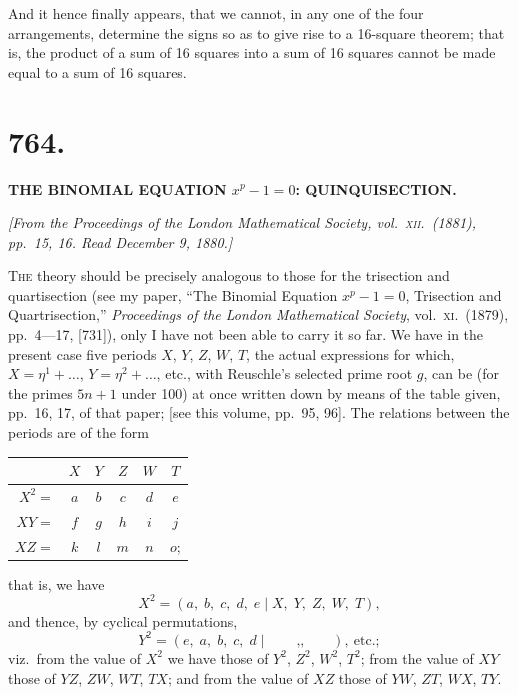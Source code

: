 \documentclass[11pt,a4paper,english]{article}
\theoremstyle{plain}
\begin{document}
And it hence finally appears, that we cannot, in any one of the four arrangements, determine the signs so as to give rise to a 16-square theorem; that is, the product of a sum of 16 squares into a sum of 16 squares cannot be made equal to a sum of 16 squares.

\newpage

\section*{764.}

\begin{center}
\textbf{THE BINOMIAL EQUATION $x^p - 1 = 0$: QUINQUISECTION.}
\end{center}

\noindent\textit{[From the \textit{Proceedings of the London Mathematical Society}, vol.\ \textsc{xii}.\ (1881), pp.\ 15, 16. Read December 9, 1880.]}

\vspace{\baselineskip}

\textsc{The} theory should be precisely analogous to those for the trisection and quartisection (see my paper, ``The Binomial Equation $x^p - 1 = 0$, Trisection and Quartrisection,'' \textit{Proceedings of the London Mathematical Society}, vol.\ \textsc{xi}.\ (1879), pp.\ 4---17, [731]), only I have not been able to carry it so far. We have in the present case five periods $X$, $Y$, $Z$, $W$, $T$, the actual expressions for which, $X = \eta^1 + \ldots$, $Y = \eta^2 + \ldots$, etc., with Reuschle's selected prime root $g$, can be (for the primes $5n + 1$ under 100) at once written down by means of the table given, pp.\ 16, 17, of that paper; [see this volume, pp.\ 95, 96]. The relations between the periods are of the form
\begin{center}
\begin{tabular}{r | c c c c c}
& $X$ & $Y$ & $Z$ & $W$ & $T$ \\ \hline
$X^2 =$ & $a$ & $b$ & $c$ & $d$ & $e$ \\
$XY =$ & $f$ & $g$ & $h$ & $i$ & $j$ \\
$XZ =$ & $k$ & $l$ & $m$ & $n$ & $o$;
\end{tabular}
\end{center}
that is, we have
\[
X^2 = (a,\; b,\; c,\; d,\; e \mid X,\; Y,\; Z,\; W,\; T),
\]
and thence, by cyclical permutations,
\[
Y^2 = (e,\; a,\; b,\; c,\; d \mid \quad\quad \text{,,}\quad\quad ),\ \text{etc.};
\]
viz.\ from the value of $X^2$ we have those of $Y^2$, $Z^2$, $W^2$, $T^2$; from the value of $XY$ those of $YZ$, $ZW$, $WT$, $TX$; and from the value of $XZ$ those of $YW$, $ZT$, $WX$, $TY$.
\end{document}
